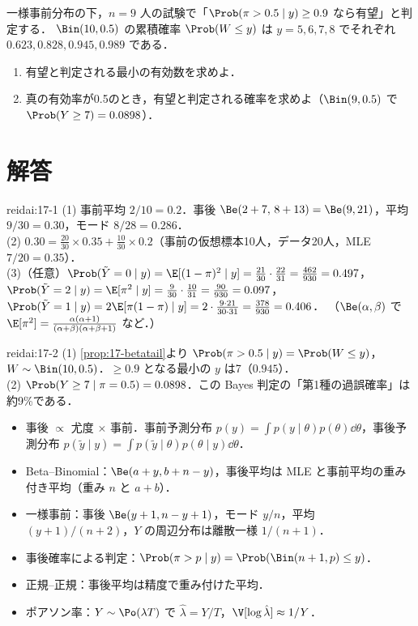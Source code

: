 \begin{reidai}[事後確率による判定]\label{reidai:17-2}
一様事前分布の下，$n=9$ 人の試験で「$\Prob(\pi>0.5\mid y)\ge0.9$ なら有望」と判定する．
$\Bin(10,0.5)$ の累積確率 $\Prob(W\le y)$ は $y=5,6,7,8$ でそれぞれ $0.623,0.828,0.945,0.989$ である．
\begin{enumerate}[label=(\arabic*)]
\item 有望と判定される最小の有効数を求めよ．
\item 真の有効率が0.5のとき，有望と判定される確率を求めよ（$\Bin(9,0.5)$ で $\Prob(Y\ge7)=0.0898$）．
\end{enumerate}
\end{reidai}

\section{解答}\label{sec:17-sol}
\begin{kaitou}{reidai:17-1}
(1) 事前平均 $2/10=0.2$．事後 $\Be(2+7,\,8+13)=\Be(9,21)$，平均 $9/30=0.30$，モード $8/28=0.286$．\\
(2) $0.30=\frac{20}{30}\times0.35+\frac{10}{30}\times0.2$（事前の仮想標本10人，データ20人，MLE $7/20=0.35$）．\\
(3)（任意）$\Prob(\tilde Y=0\mid y)=\E[(1-\pi)^2\mid y]=\frac{21}{30}\cdot\frac{22}{31}=\frac{462}{930}=0.497$，
$\Prob(\tilde Y=2\mid y)=\E[\pi^2\mid y]=\frac{9}{30}\cdot\frac{10}{31}=\frac{90}{930}=0.097$，
$\Prob(\tilde Y=1\mid y)=2\E[\pi(1-\pi)\mid y]=2\cdot\frac{9\cdot21}{30\cdot31}=\frac{378}{930}=0.406$．
（$\Be(\alpha,\beta)$ で $\E[\pi^2]=\frac{\alpha(\alpha+1)}{(\alpha+\beta)(\alpha+\beta+1)}$ など．）
\end{kaitou}

\begin{kaitou}{reidai:17-2}
(1) \cref{prop:17-betatail}より $\Prob(\pi>0.5\mid y)=\Prob(W\le y)$，$W\sim\Bin(10,0.5)$．$\ge0.9$ となる最小の $y$ は7（$0.945$）．\\
(2) $\Prob(Y\ge7\mid\pi=0.5)=0.0898$．この Bayes 判定の「第1種の過誤確率」は約9\%である．
\end{kaitou}

\begin{summarybox}
\begin{itemize}
\item 事後 $\propto$ 尤度 $\times$ 事前．事前予測分布 $p(y)=\int p(y\mid\theta)p(\theta)\dd\theta$，事後予測分布 $p(\tilde y\mid y)=\int p(\tilde y\mid\theta)p(\theta\mid y)\dd\theta$．
\item Beta--Binomial：$\Be(a+y,b+n-y)$，事後平均は MLE と事前平均の重み付き平均（重み $n$ と $a+b$）．
\item 一様事前：事後 $\Be(y+1,n-y+1)$，モード $y/n$，平均 $(y+1)/(n+2)$，$Y$ の周辺分布は離散一様 $1/(n+1)$．
\item 事後確率による判定：$\Prob(\pi>p\mid y)=\Prob(\Bin(n+1,p)\le y)$．
\item 正規--正規：事後平均は精度で重み付けた平均．
\item ポアソン率：$Y\sim\Po(\lambda T)$ で $\hat\lambda=Y/T$，$\V[\log\hat\lambda]\approx1/Y$．
\end{itemize}
\end{summarybox}
